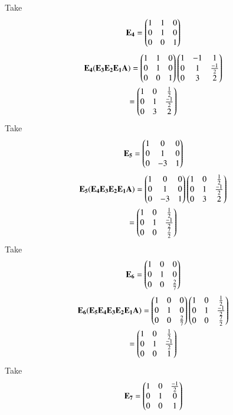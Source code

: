 \documentclass[journal,12pt,twocolumn]{IEEEtran}
\begin{document}
Take
\begin{align}
\mathbf{E_4} = \begin{pmatrix}1 & 1 & 0 \\0 & 1 &0 \\ 0 & 0&1\end{pmatrix}	
\end{align}
\begin{multline}
	\mathbf{E_4(E_3E_2E_1A)} = \begin{pmatrix}1 & 1 & 0 \\0 & 1 & 0 \\ 0 & 0 & 1\end{pmatrix}\begin{pmatrix}1 & -1 & 1 \\ 0 & 1 & \frac{-1}{2} \\ 0 & 3 & 2\end{pmatrix}\\
	= \begin{pmatrix}1 & 0 & \frac{1}{2} \\ 0 & 1 & \frac{-1}{2} \\ 0 & 3 & 2\end{pmatrix}
\end{multline}
Take
\begin{align}
\mathbf{E_5} = \begin{pmatrix}1 & 0 & 0 \\0 & 1 &0 \\ 0 & -3&1\end{pmatrix}	
\end{align}
\begin{multline}
	\mathbf{E_5(E_4E_3E_2E_1A)} = \begin{pmatrix}1 & 0 & 0 \\0 & 1 & 0 \\ 0 & -3 & 1\end{pmatrix}\begin{pmatrix}1 & 0 & \frac{1}{2} \\ 0 & 1 & \frac{-1}{2} \\ 0 & 3 & 2\end{pmatrix}\\
	= \begin{pmatrix}1 & 0 & \frac{1}{2} \\ 0 & 1 & \frac{-1}{2} \\ 0 & 0 & \frac{7}{2}\end{pmatrix}
\end{multline}
Take
\begin{align}
\mathbf{E_6} = \begin{pmatrix}1 & 0 & 0 \\0 & 1 &0 \\ 0 & 0& \frac{2}{7}\end{pmatrix}	
\end{align}
\begin{multline}
	\mathbf{E_6(E_5E_4E_3E_2E_1A)} = \begin{pmatrix}1 & 0 & 0 \\0 & 1 & 0 \\ 0 & 0 & \frac{2}{7}\end{pmatrix}\begin{pmatrix}1 & 0 & \frac{1}{2} \\ 0 & 1 & \frac{-1}{2} \\ 0 & 0 & \frac{7}{2}\end{pmatrix} \\
	= \begin{pmatrix}1 & 0 & \frac{1}{2} \\ 0 & 1 & \frac{-1}{2} \\ 0 & 0 & 1\end{pmatrix}
\end{multline}
Take
\begin{align}
	\mathbf{E_7} = \begin{pmatrix}1 & 0 & \frac{-1}{2} \\0 & 1 &0 \\ 0 & 0& 1\end{pmatrix}	
\end{align}
\end{document}

